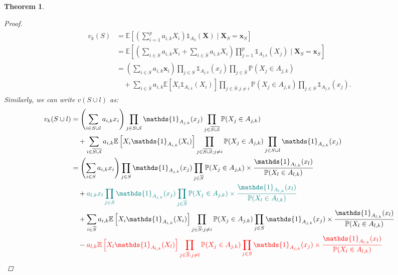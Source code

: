 \documentclass{article}
\newcommand\XS{\boldsymbol{X}_S}
\newcommand\X{\boldsymbol{X}}
\newcommand\xs{\boldsymbol{x}_S}
\newcommand\x{\boldsymbol{x}}
\theoremstyle{plain}
\newtheorem{theorem}{Theorem}[section]
\theoremstyle{definition}
\theoremstyle{remark}
\begin{document}
\begin{theorem}
\begin{proof}
    \begin{align*}
        \begin{split}
         v_k(S) & = \mathbb{E}\left[\left(\sum_{i=1}^p a_{i, k} X_i \right)\mathds{1}_{A_k}(\X) \;|\; \XS = \xs \right] \\
         & = \mathbb{E}\left[\left(\sum_{i \in S} a_{i, k} X_i  + \sum_{i \in \bar{S}} a_{i, k} X_i \right) \prod_{j=1}^p \mathds{1}_{A_{j, k}}(X_j) \;|\; \XS = \xs \right] \\
         & = \left(\sum_{i \in S} a_{i, k} \x_i  \right) \prod_{j \in S} \mathds{1}_{A_{j, k}}(x_j) \prod_{j \in \bar{S}} \mathbb{P}(X_j \in A_{j, k}) \\
         & \quad + \sum_{i \in \bar{S}} a_{i, k} \mathbb{E}\left[ X_i \mathds{1}_{A_{i, k}}(X_i)\right] \prod_{j \in \bar{S}: j \neq i}\mathbb{P}(X_j \in A_{j, k}) \prod_{j \in S} \mathds{1}_{A_{j, k}}(x_j).
        \end{split} 
    \end{align*}
Similarly, we can write $v(S \cup l)$ as:
    \begin{align*}
         v_k(S\cup l) & =  \left(\sum_{i \in S\cup l} a_{i, k} x_i  \right) \prod_{j \in S\cup l} \mathds{1}_{A_{j, k}}(x_j) \prod_{j\in \overline{S\cup l}} \mathbb{P}(X_j \in A_{j, k}) \\
         & \quad + \sum_{i \in \overline{S\cup l}} a_{i, k} \mathbb{E}\left[ X_i \mathds{1}_{A_{i, k}}(X_i)\right] \prod_{j \in \overline{S \cup l}: j \neq i}\mathbb{P}(X_j \in A_{j, k}) \prod_{j \in S\cup l} \mathds{1}_{A_{j, k}}(x_j) \\
         & =  \left(\sum_{i \in S} a_{i, k} x_i  \right) \prod_{j \in S} \mathds{1}_{A_{j, k}}(x_j) \prod_{j \in \overline{S}} \mathbb{P}(X_j \in A_{j, k})  \times \frac{\mathds{1}_{A_{l, k}}(x_l)}{\mathbb{P}(X_l \in A_{l, k})}\\
         & \quad + \textcolor{teal}{a_{l, k} x_l   \prod_{j \in S} \mathds{1}_{A_{j, k}}(x_j) \prod_{j \in \overline{S}} \mathbb{P}(X_j \in A_{j, k})  \times \frac{\mathds{1}_{A_{l, k}}(x_l)}{\mathbb{P}(X_l \in A_{l, k})}} \\ 
         & \quad + \sum_{i \in \overline{S}} a_{i, k} \mathbb{E}\left[ X_i \mathds{1}_{A_{i, k}}(X_i)\right] \prod_{j \in \overline{S}: j \neq i}\mathbb{P}(X_j \in A_{j, k}) \prod_{j \in S} \mathds{1}_{A_{j, k}}(x_j) \times \frac{\mathds{1}_{A_{l, k}}(x_l)}{\mathbb{P}(X_l \in A_{l, k})} \\
         & \quad - \textcolor{red}{a_{l, k} \mathbb{E}\left[ X_l \mathds{1}_{A_{l, k}}(X_l)\right] \prod_{j \in \overline{S}: j \neq l}\mathbb{P}(X_j \in A_{j, k}) \prod_{j \in S} \mathds{1}_{A_{j, k}}(x_j) \times \frac{\mathds{1}_{A_{l, k}}(x_l)}{\mathbb{P}(X_l \in A_{l, k})}} \\

\end{align*}
\end{proof}
\end{theorem}
\end{document}
